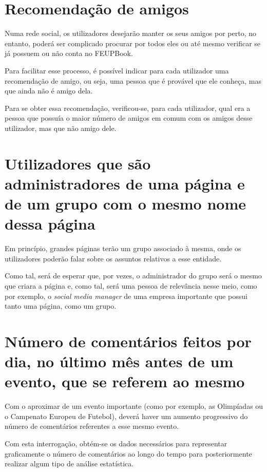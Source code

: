 \documentclass[12pt]{report}
\begin{document}
\section{Recomendação de amigos}

Numa rede social, os utilizadores desejarão manter os seus amigos por perto, no entanto, poderá ser complicado procurar por todos eles ou até mesmo verificar se já possuem ou não conta no FEUPBook. \par

Para facilitar esse processo, é possível indicar para cada utilizador uma recomendação de amigo, ou seja, uma pessoa que é provável que ele conheça, mas que ainda não é amigo dela. \par

Para se obter essa recomendação, verificou-se, para cada utilizador, qual era a pessoa que possuía o maior número de amigos em comum com os amigos desse utilizador, mas que não amigo dele.

\section{Utilizadores que são administradores de uma página e de um grupo com o mesmo nome dessa página}

Em princípio, grandes páginas terão um grupo associado à mesma, onde os utilizadores poderão falar sobre os assuntos relativos a esse entidade. \par

Como tal, será de esperar que, por vezes, o administrador do grupo será o mesmo que criara a página e, como tal, será uma pessoa de relevância nesse meio, como por exemplo, o \textit{social media manager} de uma empresa importante que possui tanto uma página, como um grupo.

\section{Número de comentários feitos por dia, no último mês antes de um evento, que se referem ao mesmo}

Com o aproximar de um evento importante (como por exemplo, as Olimpíadas ou o Campenato Europeu de Futebol), deverá haver um aumento progressivo do número de comentários referentes a esse mesmo evento. \par

Com esta interrogação, obtém-se os dados necessários para representar graficamente o número de comentários ao longo do tempo para posteriormente realizar algum tipo de análise estatística.
\end{document}
